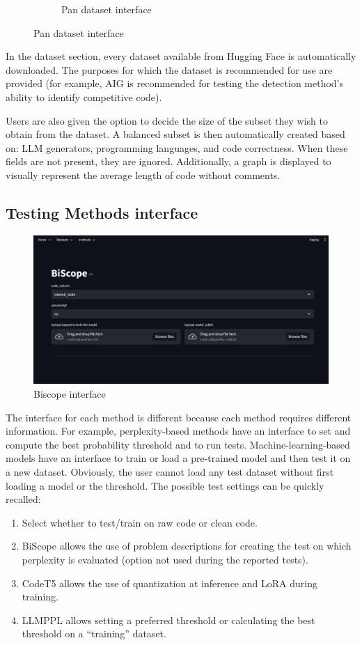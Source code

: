 \begin{figure}[H]
\begin{subfigure}[t]{0.45\textwidth}
        \caption{Pan dataset interface}
        \label{fig:ab2sceyg}
    \end{subfigure}
\end{figure}

In the dataset section, every dataset available from Hugging 
Face is automatically downloaded. The purposes for which the 
dataset is recommended for use are provided (for example, AIG 
is recommended for testing the detection method's ability to 
identify competitive code).

Users are also given the option to decide the size of the 
subset they wish to obtain from the dataset. A balanced subset 
is then automatically created based on: LLM generators, 
programming languages, and code correctness. When these 
fields are not present, they are ignored. Additionally, a 
graph is displayed to visually represent the average length 
of code without comments.


\subsection{Testing Methods interface}
\begin{figure}[H]
        \centering
        \includegraphics[width=0.8\linewidth]{img/interfaccia/Screenshot 2025-09-27 172640.png}
        \caption{Biscope interface}
        \label{fig:errit}
\end{figure}

The interface for each method is different because each method requires 
different information. For example, perplexity-based methods have an interface 
to set and compute the best probability threshold and to run tests. 
Machine-learning-based models have an interface to train or load a 
pre-trained model and then test it on a new dataset. Obviously, 
the user cannot load any test dataset without first loading a model 
or the threshold.
The possible test settings can be quickly recalled:
\begin{enumerate}
\item Select whether to test/train on raw code or clean code.
\item BiScope allows the use of problem descriptions for creating the test on which perplexity is evaluated (option not used during the reported tests).
\item CodeT5 allows the use of quantization at inference and LoRA during training.
\item LLMPPL allows setting a preferred threshold or calculating the best threshold on a “training” dataset.
\end{enumerate}

